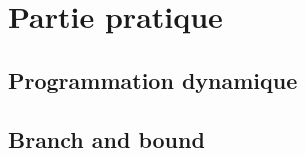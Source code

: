 \documentclass[a4paper, 12pt]{article}
\begin{document}
\section{Partie pratique}

\subsection{Programmation dynamique}

\subsection{Branch and bound}
\end{document}
